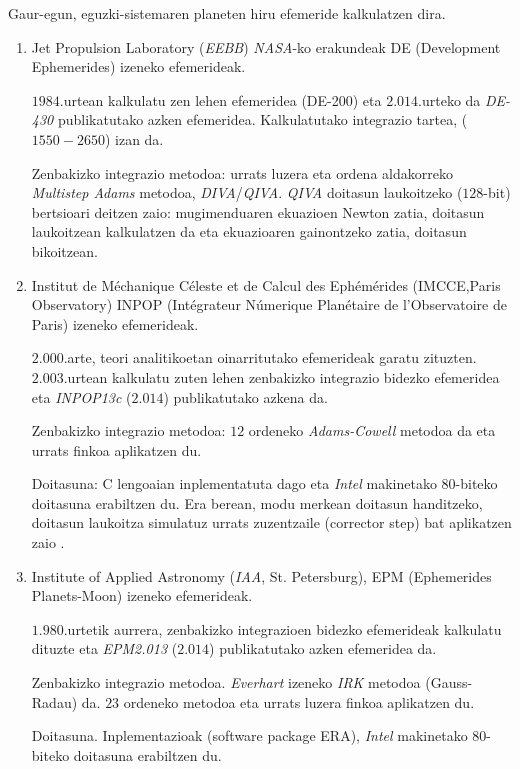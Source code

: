 Gaur-egun, eguzki-sistemaren planeten hiru efemeride kalkulatzen dira.
\begin{enumerate}
\item Jet Propulsion Laboratory (\emph{EEBB}) \emph{NASA}-ko erakundeak DE (Development Ephemerides) izeneko efemerideak.

      $1984$.urtean kalkulatu zen lehen efemeridea (DE-200) eta $2.014$.urteko da \emph{DE-430} \cite{Folkner2014} publikatutako azken efemeridea. Kalkulatutako integrazio tartea, ($1550-2650$) izan da.

      Zenbakizko integrazio metodoa: urrats luzera eta  ordena aldakorreko \emph{Multistep Adams} metodoa, \cite{Krogh1997} \emph{DIVA}/\emph{QIVA}. \emph{QIVA} doitasun laukoitzeko ($128$-bit) bertsioari deitzen zaio: mugimenduaren ekuazioen Newton zatia, doitasun laukoitzean kalkulatzen da eta ekuazioaren gainontzeko zatia, doitasun bikoitzean.

\item Institut de Méchanique Céleste et de Calcul des Ephémérides (IMCCE,Paris Observatory) INPOP (Intégrateur Númerique Planétaire de l'Observatoire de Paris) izeneko efemerideak.
      
      $2.000$.arte, teori analitikoetan oinarritutako efemerideak garatu zituzten. $2.003$.urtean kalkulatu zuten lehen zenbakizko integrazio bidezko efemeridea eta \emph{INPOP13c} ($2.014$) \cite{Fienga2008} publikatutako azkena da.
           
	  Zenbakizko integrazio metodoa: $12$ ordeneko \emph{Adams-Cowell} metodoa da eta urrats finkoa aplikatzen du.
	  
	  Doitasuna: C lengoaian inplementatuta dago eta \emph{Intel} makinetako $80$-biteko doitasuna erabiltzen du. Era berean, modu merkean doitasun handitzeko, doitasun laukoitza simulatuz urrats zuzentzaile (corrector step) bat aplikatzen zaio \cite{Fienga2008}.  
	  
  
\item Institute of Applied Astronomy (\emph{IAA}, St. Petersburg), EPM (Ephemerides Planets-Moon) izeneko efemerideak.
      
      $1.980$.urtetik aurrera, zenbakizko integrazioen bidezko efemerideak kalkulatu dituzte eta  \emph{EPM2.013} ($2.014$) \cite{Pitjeva2014} publikatutako azken efemeridea da.
      
      Zenbakizko integrazio metodoa. \emph{Everhart} izeneko \emph{IRK} metodoa (Gauss-Radau) da. $23$ ordeneko metodoa eta urrats luzera finkoa aplikatzen du.
            
      Doitasuna. Inplementazioak (software package ERA), \emph{Intel} makinetako $80$-biteko doitasuna erabiltzen du.
      
\end{enumerate}


